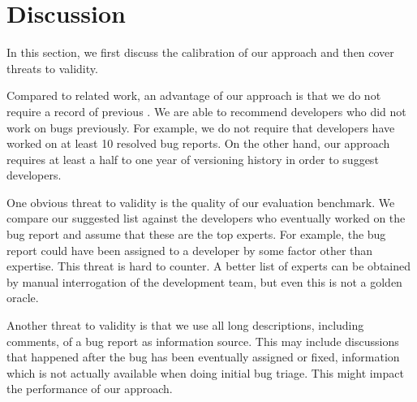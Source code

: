 \section{Discussion}\label{sec:discussion}

In this section, we first discuss the calibration of our approach and then cover threats to validity.

Compared to related work, an advantage of our approach is that we do not require a record of previous \BRs. We are able to recommend developers who did not work on bugs previously. For example, we do not require that developers have worked on at least 10 resolved bug reports. On the other hand, our approach requires at least a half to one year of versioning history in order to suggest developers. 

One obvious threat to validity is the quality of our evaluation benchmark. We compare our suggested list against the developers who eventually worked on the bug report and assume that these are the top experts. For example, the bug report could have been assigned to a developer by some factor other than expertise. This threat is hard to counter. A better list of experts can be obtained by manual interrogation of the development team, but even this is not a golden oracle.

Another threat to validity is that we use all long descriptions, including comments, of a bug report as information source. This may include discussions that happened after the bug has been eventually assigned or fixed, information which is not actually available when doing initial bug triage. This might impact the performance of our approach. 


